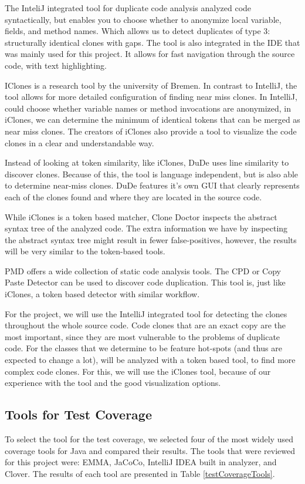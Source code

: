 \documentclass[]{article}
\begin{document}
The InteliJ integrated tool for duplicate code analysis analyzed code syntactically, but enables you to choose whether to anonymize local variable, fields, and method names. Which allows us to detect duplicates of type 3: structurally identical clones with gaps. The tool is also integrated in the IDE that was mainly used for this project. It allows for fast navigation through the source code, with text highlighting. 

IClones is a research tool by the university of Bremen. In contrast to IntelliJ, the tool allows for more detailed configuration of finding near miss clones. In IntelliJ, could choose whether variable names or method invocations are anonymized, in iClones, we can determine the minimum of identical tokens that can be merged as near miss clones. The creators of iClones also provide a tool to visualize the code clones in a clear and understandable way.

Instead of looking at token similarity, like iClones, DuDe uses line similarity to discover clones. Because of this, the tool is language independent, but is also able to determine near-miss clones. DuDe features it's own GUI that clearly represents each of the clones found and where they are located in the source code.

While iClones is a token based matcher, Clone Doctor inspects the abstract syntax tree of the analyzed code. The extra information we have by inspecting the abstract syntax tree might result in fewer false-positives, however, the results will be very similar to the token-based tools. 

PMD offers a wide collection of static code analysis tools. The CPD or Copy Paste Detector can be used to discover code duplication. This tool is, just like iClones, a token based detector with similar workflow. 

For the project, we will use the IntelliJ integrated tool for detecting the clones throughout the whole source code. Code clones that are an exact copy are the most important, since they are most vulnerable to the problems of duplicate code. For the classes that we determine to be feature hot-spots (and thus are expected to change a lot), will be analyzed with a token based tool, to find more complex code clones. For this, we will use the iClones tool, because of our experience with the tool and the good visualization options.





\subsection{Tools for Test Coverage}
To select the tool for the test coverage, we selected four of the most widely used coverage tools for Java and compared their results. The tools that were reviewed for this project were: EMMA, JaCoCo, IntelliJ IDEA built in analyzer, and Clover. The results of each tool are presented in Table \ref{testCoverageTools}.
\end{document}

